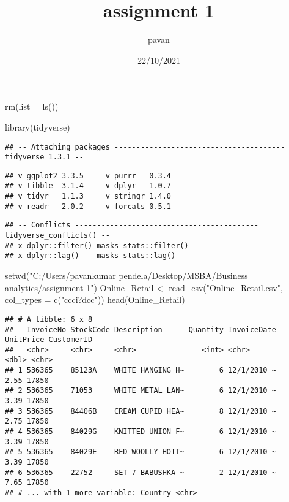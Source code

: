\documentclass[
]{article}
\title{assignment 1}
\author{pavan}
\date{22/10/2021}
\newenvironment{Shaded}{\begin{snugshade}}{\end{snugshade}}
\newcommand{\AttributeTok}[1]{\textcolor[rgb]{0.77,0.63,0.00}{#1}}
\newcommand{\FunctionTok}[1]{\textcolor[rgb]{0.00,0.00,0.00}{#1}}
\newcommand{\NormalTok}[1]{#1}
\newcommand{\OtherTok}[1]{\textcolor[rgb]{0.56,0.35,0.01}{#1}}
\newcommand{\StringTok}[1]{\textcolor[rgb]{0.31,0.60,0.02}{#1}}
\begin{document}
\maketitle

\begin{Shaded}
\begin{Highlighting}[]
\FunctionTok{rm}\NormalTok{(}\AttributeTok{list =} \FunctionTok{ls}\NormalTok{())}
\end{Highlighting}
\end{Shaded}

\begin{Shaded}
\begin{Highlighting}[]
\FunctionTok{library}\NormalTok{(tidyverse)}
\end{Highlighting}
\end{Shaded}

\begin{verbatim}
## -- Attaching packages --------------------------------------- tidyverse 1.3.1 --
\end{verbatim}

\begin{verbatim}
## v ggplot2 3.3.5     v purrr   0.3.4
## v tibble  3.1.4     v dplyr   1.0.7
## v tidyr   1.1.3     v stringr 1.4.0
## v readr   2.0.2     v forcats 0.5.1
\end{verbatim}

\begin{verbatim}
## -- Conflicts ------------------------------------------ tidyverse_conflicts() --
## x dplyr::filter() masks stats::filter()
## x dplyr::lag()    masks stats::lag()
\end{verbatim}

\begin{Shaded}
\begin{Highlighting}[]
\FunctionTok{setwd}\NormalTok{(}\StringTok{"C:/Users/pavankumar pendela/Desktop/MSBA/Business analytics/assignment 1"}\NormalTok{)}
\NormalTok{Online\_Retail }\OtherTok{\textless{}{-}} \FunctionTok{read\_csv}\NormalTok{(}\StringTok{"Online\_Retail.csv"}\NormalTok{, }\AttributeTok{col\_types =} \FunctionTok{c}\NormalTok{(}\StringTok{"ccci?dcc"}\NormalTok{))}
\FunctionTok{head}\NormalTok{(Online\_Retail)}
\end{Highlighting}
\end{Shaded}

\begin{verbatim}
## # A tibble: 6 x 8
##   InvoiceNo StockCode Description      Quantity InvoiceDate UnitPrice CustomerID
##   <chr>     <chr>     <chr>               <int> <chr>           <dbl> <chr>     
## 1 536365    85123A    WHITE HANGING H~        6 12/1/2010 ~      2.55 17850     
## 2 536365    71053     WHITE METAL LAN~        6 12/1/2010 ~      3.39 17850     
## 3 536365    84406B    CREAM CUPID HEA~        8 12/1/2010 ~      2.75 17850     
## 4 536365    84029G    KNITTED UNION F~        6 12/1/2010 ~      3.39 17850     
## 5 536365    84029E    RED WOOLLY HOTT~        6 12/1/2010 ~      3.39 17850     
## 6 536365    22752     SET 7 BABUSHKA ~        2 12/1/2010 ~      7.65 17850     
## # ... with 1 more variable: Country <chr>
\end{verbatim}
\end{document}
